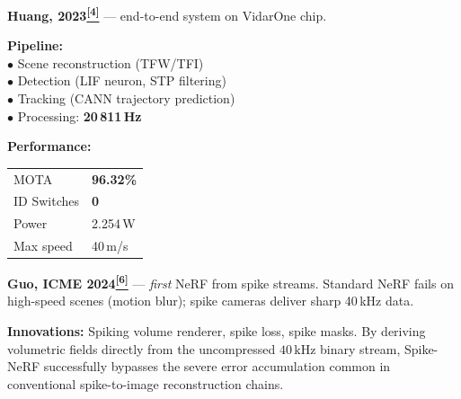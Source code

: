\documentclass[final]{beamer}
\newcommand{\paper}[1]{\hyperlink{ref:#1}{\textcolor{TealAccent}{\textsuperscript{\textbf{[#1]}}}}}
\newcommand{\metric}[1]{\textcolor{AccentOrange}{\textbf{#1}}}
\newlength{\CW}\setlength{\CW}{38.0cm}    %
\newlength{\FW}\setlength{\FW}{119.0cm}   %
\begin{document}
\begin{frame}[t]{}
\begin{columns}[T,totalwidth=\FW]
\begin{column}{\CW}
\begin{tcolorbox}[pbox=HWCol,
  title={High-Speed Vision System\paper{4}}]
\normalsize
\textbf{Huang, 2023\paper{4}} — end-to-end system on VidarOne chip.

\medskip
\begin{minipage}[t]{0.52\linewidth}
\textbf{Pipeline:}\\
$\bullet$ Scene reconstruction (TFW/TFI)\\
$\bullet$ Detection (LIF neuron, STP filtering)\\
$\bullet$ Tracking (CANN trajectory prediction)\\
$\bullet$ Processing: \metric{20\,811\,Hz}
\end{minipage}\hfill
\begin{minipage}[t]{0.44\linewidth}
\textbf{Performance:}\\[2pt]
\begin{tabular}{ll}
\toprule
MOTA & \metric{96.32\%} \\
ID Switches & \metric{0} \\
Power & 2.254\,W \\
Max speed & 40\,m/s\\
\bottomrule
\end{tabular}
\end{minipage}
\end{tcolorbox}

\vspace{0.12cm}

\begin{tcolorbox}[pbox=ReprCol,
  title={Neural Scene Representation — Spike-NeRF\paper{6}}]
\normalsize
\textbf{Guo, ICME 2024\paper{6}} — \emph{first} NeRF from spike streams.
Standard NeRF fails on high-speed scenes (motion blur);
spike cameras deliver sharp 40\,kHz data.

\medskip
\textbf{Innovations:} Spiking volume renderer, spike loss, spike masks. By deriving volumetric fields directly from the uncompressed $40\,\mathrm{kHz}$ binary stream, Spike-NeRF successfully bypasses the severe error accumulation common in conventional spike-to-image reconstruction chains.


\end{tcolorbox}
\end{column}
\end{columns}
\end{frame}
\end{document}
